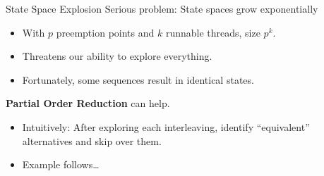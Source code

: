 \documentclass[xcolor=dvipsnames]{beamer}
\begin{document}
\begin{frame}{State Space Explosion}
	Serious problem: State spaces grow exponentially
	\begin{itemize}
		\item With $p$ preemption points and $k$ runnable threads, size $p^k$.
		\item Threatens our ability to explore everything.
		\item Fortunately, some sequences result in identical states.
	\end{itemize}
	\linegap

	{\bf Partial Order Reduction} can help.
	\begin{itemize}
		\item Intuitively: After exploring each interleaving, identify ``equivalent'' alternatives and skip over them.
		\item Example follows\dots
	\end{itemize}
\end{frame}
\end{document}
